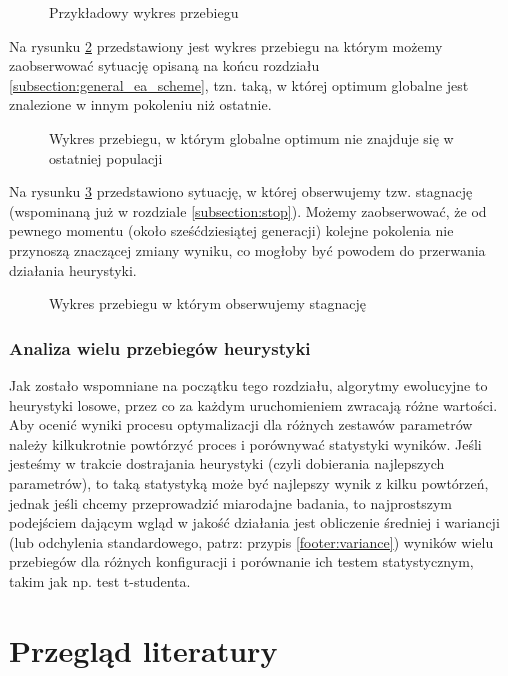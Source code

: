 \documentclass[twoside]{iisthesis}
\newcommand{\graph}[1]{}
\begin{document}
\begin{figure}[H]
	\caption{Przykładowy wykres przebiegu \label{plot:random_example}}
	\centering
	\graph{random_example.tex}
\end{figure}

Na rysunku \ref{plot:mid_opt} przedstawiony jest wykres przebiegu na którym możemy zaobserwować sytuację opisaną na końcu rozdziału \ref{subsection:general_ea_scheme}, tzn. taką, w której optimum globalne jest znalezione w innym pokoleniu niż ostatnie.

\begin{figure}[H]
	\caption{Wykres przebiegu, w którym globalne optimum nie znajduje się w ostatniej populacji \label{plot:mid_opt}}
	\centering
	\graph{mid_optimum.tex}
\end{figure}

Na rysunku \ref{plot:stagnation} przedstawiono sytuację, w której obserwujemy tzw. stagnację (wspominaną już w rozdziale \ref{subsection:stop}). Możemy zaobserwować, że od pewnego momentu (około sześćdziesiątej generacji) kolejne pokolenia nie przynoszą znaczącej zmiany wyniku, co mogłoby być powodem do przerwania działania heurystyki.

\begin{figure}[H]
	\caption{Wykres przebiegu w którym obserwujemy stagnację \label{plot:stagnation}}
	\centering
	\graph{stagnation.tex}
\end{figure}

\subsection{Analiza wielu przebiegów heurystyki}

Jak zostało wspomniane na początku tego rozdziału, algorytmy ewolucyjne to heurystyki losowe, przez co za każdym uruchomieniem zwracają różne wartości. Aby ocenić wyniki procesu optymalizacji dla różnych zestawów parametrów należy kilkukrotnie powtórzyć proces i porównywać statystyki wyników. Jeśli jesteśmy w trakcie dostrajania heurystyki (czyli dobierania najlepszych parametrów), to taką statystyką może być najlepszy wynik z kilku powtórzeń, jednak jeśli chcemy przeprowadzić miarodajne badania, to najprostszym podejściem dającym wgląd w jakość działania jest obliczenie średniej i wariancji (lub odchylenia standardowego, patrz: przypis \ref{footer:variance}) wyników wielu przebiegów dla różnych konfiguracji i porównanie ich testem statystycznym, takim jak np. test t-studenta.

\chapter{Przegląd literatury} \label{chapter:literature}
\end{document}
